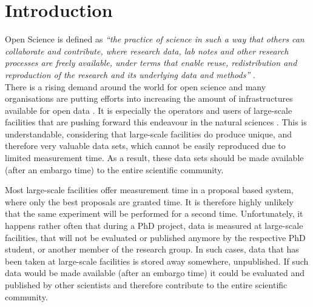 \documentclass[aps,pra,reprint,amsmath,amssymb,superscriptaddress,showkeys]{revtex4-1}
\begin{document}
\maketitle



\section{Introduction}

Open Science is defined as \emph{``the practice of science in such a way that others can collaborate and contribute, where research data, lab notes and other research processes are freely available, under terms that enable reuse, redistribution and reproduction of the research and its underlying data and methods''} \cite{foster}.\\

There is a rising demand around the world for open science and many organisations are putting efforts into increasing the amount of infrastructures available for open data \cite{plos, sharing, panosc, nfdi, expands}. 
It is especially the operators and users of large-scale facilities that are pushing forward this endeavour in the natural sciences \cite{panosc, nfdi, expands}.
This is understandable, considering that large-scale facilities do produce unique, and therefore very valuable data sets, which cannot be easily reproduced due to limited measurement time. As a result, these data sets should be made available (after an embargo time) to the entire scientific community. 

Most large-scale facilities offer measurement time in a proposal based system, where only the best proposals are granted time.
It is therefore highly unlikely that the same experiment will be performed for a second time. 
Unfortunately, it happens rather often that during a PhD project, data is measured at large-scale facilities, that will not be evaluated or published anymore by the respective PhD student, or another member of the research group.
In such cases, data that has been taken at large-scale facilities is stored away somewhere, unpublished.
If such data would be made available (after an embargo time) it could be evaluated and published by other scientists and therefore contribute to the entire scientific community.
\end{document}
